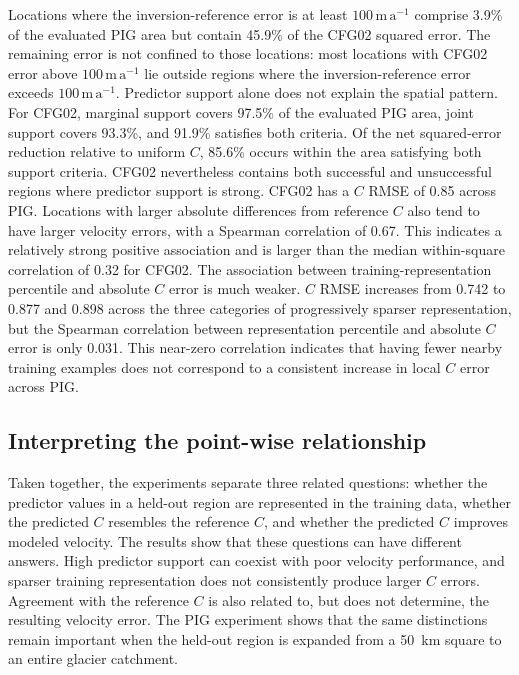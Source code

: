 \documentclass[review,jog]{igs}
\begin{document}
Locations where the inversion-reference error is at least $100\,\mathrm{m\,a^{-1}}$ comprise 3.9\% of the evaluated PIG area but contain 45.9\% of the CFG02 squared error. The remaining error is not confined to those locations: most locations with CFG02 error above $100\,\mathrm{m\,a^{-1}}$ lie outside regions where the inversion-reference error exceeds $100\,\mathrm{m\,a^{-1}}$. Predictor support alone does not explain the spatial pattern. For CFG02,
marginal support covers 97.5\% of the evaluated PIG area, joint support covers
93.3\%, and 91.9\% satisfies both criteria. Of the net squared-error reduction
relative to uniform $C$, 85.6\% occurs within the area satisfying both support
criteria. CFG02 nevertheless contains both successful and unsuccessful regions
where predictor support is strong.
CFG02 has a $C$ RMSE of 0.85 across PIG. Locations with larger absolute differences from reference $C$ also tend to have larger velocity errors, with a Spearman correlation of 0.67. This indicates a relatively strong positive association and is larger than the median within-square correlation of 0.32 for CFG02. The association between training-representation percentile and absolute $C$ error is much weaker. $C$ RMSE increases from 0.742 to 0.877 and 0.898 across the three categories of progressively sparser representation, but the Spearman correlation between representation percentile and absolute $C$ error is only 0.031. This near-zero correlation indicates that having fewer nearby training examples does not correspond to a consistent increase in local $C$ error across PIG.



\subsection{Interpreting the point-wise relationship}

Taken together, the experiments separate three related questions: whether the
predictor values in a held-out region are represented in the training data,
whether the predicted $C$ resembles the reference $C$, and whether the
predicted $C$ improves modeled velocity. The results show that these questions
can have different answers. High predictor support can coexist with poor
velocity performance, and sparser training representation does not consistently
produce larger $C$ errors. Agreement with the reference $C$ is also related to,
but does not determine, the resulting velocity error. The PIG experiment shows
that the same distinctions remain important when the held-out region is
expanded from a 50~km square to an entire glacier catchment.
\end{document}
